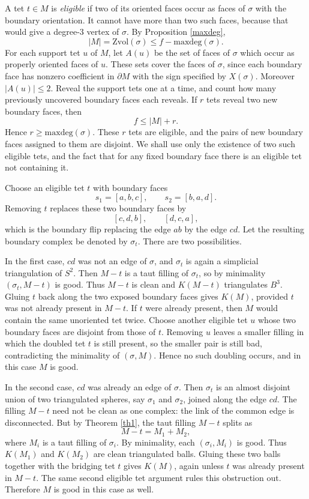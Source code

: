 \documentclass[12pt]{article}
\def\del{\partial}
\newcommand{\kw}{\mathrm}
\newcommand{\maxdeg}{\kw{maxdeg}}
\newcommand{\Zvol}{\kw{Zvol}}
\begin{document}
A tet $t\in M$ is \emph{eligible} if two of its oriented faces occur as faces
of $\sigma$ with the boundary orientation.  It cannot have more than two such
faces, because that would give a degree-$3$ vertex of $\sigma$.  By
Proposition \ref{maxdeg},
\[
 |M|=\Zvol(\sigma)\leq f-\maxdeg(\sigma).
\]
For each support tet $u$ of $M$, let $A(u)$ be the set of faces of $\sigma$
which occur as properly oriented faces of $u$.  These sets cover the faces of
$\sigma$, since each boundary face has nonzero coefficient in $\del M$ with
the sign specified by $X(\sigma)$.  Moreover $|A(u)|\leq 2$.  Reveal the
support tets one at a time, and count how many previously uncovered boundary
faces each reveals.  If $r$ tets reveal two new boundary faces, then
\[
 f\leq |M|+r.
\]
Hence $r\geq \maxdeg(\sigma)$.  These $r$ tets are eligible, and the pairs of
new boundary faces assigned to them are disjoint.  We shall use only the
existence of two such eligible tets, and the fact that for any fixed boundary
face there is an eligible tet not containing it.

Choose an eligible tet $t$ with boundary faces
\[
 s_1=[a,b,c],\qquad s_2=[b,a,d].
\]
Removing $t$ replaces these two boundary faces by
\[
 [c,d,b],\qquad [d,c,a],
\]
which is the boundary flip replacing the edge $ab$ by the edge $cd$.
Let the resulting boundary complex be denoted by $\sigma_t$.  There are two
possibilities.

In the first case, $cd$ was not an edge of $\sigma$, and $\sigma_t$ is again
a simplicial triangulation of $S^2$.  Then $M-t$ is a taut filling of
$\sigma_t$, so by minimality $(\sigma_t,M-t)$ is good.  Thus $M-t$ is clean
and $K(M-t)$ triangulates $B^3$.  Gluing $t$ back along the two exposed
boundary faces gives $K(M)$, provided $t$ was not already present in $M-t$.
If $t$ were already present, then $M$ would contain the same unoriented tet
twice.  Choose another eligible tet $u$ whose two boundary faces are disjoint
from those of $t$.  Removing $u$ leaves a smaller filling in which the doubled
tet $t$ is still present, so the smaller pair is still bad, contradicting the
minimality of $(\sigma,M)$.  Hence no such doubling occurs, and in this case
$M$ is good.

In the second case, $cd$ was already an edge of $\sigma$.  Then $\sigma_t$ is
an almost disjoint union of two triangulated spheres, say $\sigma_1$ and
$\sigma_2$, joined along the edge $cd$.  The filling $M-t$ need not be clean
as one complex: the link of the common edge is disconnected.  But by
Theorem \ref{th1}, the taut filling $M-t$ splits as
\[
 M-t=M_1+M_2,
\]
where $M_i$ is a taut filling of $\sigma_i$.  By minimality, each
$(\sigma_i,M_i)$ is good.  Thus $K(M_1)$ and $K(M_2)$ are clean triangulated
balls.  Gluing these two balls together with the bridging tet $t$ gives
$K(M)$, again unless $t$ was already present in $M-t$.  The same second
eligible tet argument rules this obstruction out.  Therefore $M$ is good in
this case as well.
\end{document}
